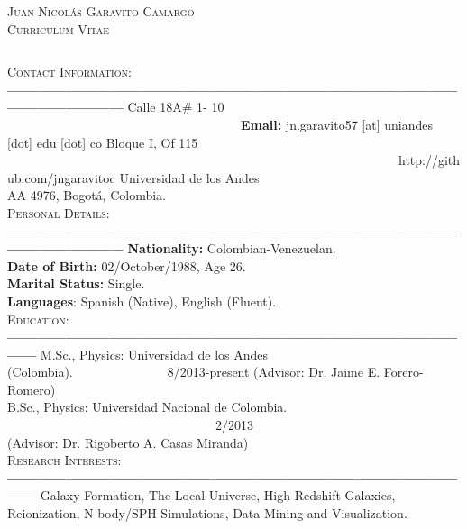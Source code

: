 \documentclass[letterpaper]{article}
\begin{document}
\begin{center}
\textsc{\LARGE Juan Nicol\'as Garavito Camargo}\\
\textsc{\large Curriculum Vitae}\\
\end{center}

$    $


\textsc{\Large Contact Information:}\\
{\bf---------------------------------------------------------------------------------------------------------------------}
Calle 18A\# 1- 10 \indent \ \ \ \ \ \ \ \ \ \ \ \ \ \ \ \ \ \ \ \ \ \ \ \ \ \ \ \ \ \ \ \ \ \  \ \  \ {\bf Email:} jn.garavito57 [at] uniandes [dot] edu [dot] co
Bloque I, Of 115 \indent \ \ \ \ \ \ \ \ \ \ \ \ \ \ \ \ \ \ \ \ \ \ \ \ \ \ \ \ \ \ \ \ \ \ \ \ \ \ \ \ \ \ \ \ \ \ \ \ \ \ \ \ \ \ \ \ \ \ \ \ \ \    http://github.com/jngaravitoc
Universidad de los Andes\\
AA 4976, Bogot\'a, Colombia.\\

\indent \textsc{\Large Personal Details:}\\
{\bf---------------------------------------------------------------------------------------------------------------------}
{\bf \large Nationality:} \large Colombian-Venezuelan.\\
{\bf Date of Birth:} 02/October/1988, Age 26.\\
{\bf Marital Status:} Single.\\
{\bf Languages}: Spanish (Native), English (Fluent).\\

\textsc{\Large Education:}\\
{\bf---------------------------------------------------------------------------------------------------}
M.Sc., Physics: Universidad de los Andes (Colombia).\indent \ \ \ \ \ \ \ \ \ \ \ \ \ \ \  8/2013-present
(Advisor: Dr. Jaime E. Forero-Romero)\\
B.Sc., Physics: Universidad Nacional de Colombia. \indent \ \ \ \ \ \ \ \ \ \ \ \ \ \ \ \ \ \ \ \ \ \ \ \ \ \ \ \ \ \ \ \ \ 2/2013\\
(Advisor: Dr. Rigoberto A. Casas Miranda)\\

\textsc{\Large Research Interests:}\\
{\bf---------------------------------------------------------------------------------------------------}
Galaxy Formation, The Local Universe, High Redshift Galaxies, Reionization,  N-body/SPH Simulations, Data Mining
and Visualization.\\
\end{document}
